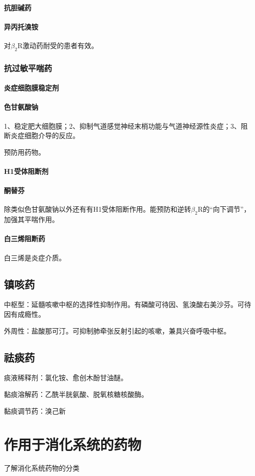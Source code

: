 \documentclass[UTF8]{ctexbook}
\begin{document}
\subsubsection{抗胆碱药}
\subsubsection{异丙托溴铵}
对\(\beta_{2}\)R激动药耐受的患者有效。
\subsection{抗过敏平喘药}
\subsubsection{炎症细胞膜稳定剂}
\subsubsection{色甘氨酸钠}
1、稳定肥大细胞膜；2、抑制气道感觉神经末梢功能与气道神经源性炎症；3、阻断炎症细胞介导的反应。

预防用药物。
\subsubsection{H1受体阻断剂}
\subsubsection{酮替芬}
除类似色甘氨酸钠以外还有有H1受体阻断作用。能预防和逆转\(\beta_{2}\)R的“向下调节”，加强其平喘作用。
\subsubsection{白三烯阻断药}白三烯是炎症介质。
\section{镇咳药}
中枢型：延髓咳嗽中枢的选择性抑制作用。有磷酸可待因、氢溴酸右美沙芬。可待因有成瘾性。

外周性：盐酸那可汀。可抑制肺牵张反射引起的咳嗽，兼具兴奋呼吸中枢。
\section{祛痰药}
痰液稀释剂：氯化铵、愈创木酚甘油醚。

黏痰溶解药：乙酰半胱氨酸、脱氧核糖核酸酶。

黏痰调节药：溴己新
\chapter{作用于消化系统的药物}
了解消化系统药物的分类
\end{document}
